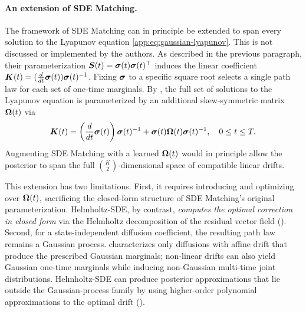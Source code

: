 \paragraph{An extension of SDE Matching.}
The framework of SDE Matching \cite{bartosh2025sde} can in principle be extended to span every solution to the Lyapunov equation \eqref{app:eq:gaussian-lyapunov}.
This is not discussed or implemented by the authors. 
As described in the previous paragraph, their parameterization $\boldsymbol{S}(t) = \boldsymbol{\sigma}(t)\boldsymbol{\sigma}(t)^\top$ induces the linear coefficient $\boldsymbol{K}(t) = (\frac{d}{dt}\boldsymbol{\sigma}(t)) \boldsymbol{\sigma}(t)^{-1}$. 
Fixing $\boldsymbol{\sigma}$ to a specific square root selects a single path law for each set of one-time marginals. 
By , the full set of solutions to the Lyapunov equation is parameterized by an additional skew-symmetric matrix $\boldsymbol{\Omega}(t)$ via
\begin{equation*}
    \boldsymbol{K}(t) = \left(\frac{d}{dt}\boldsymbol{\sigma}(t) \right) \boldsymbol{\sigma}(t)^{-1} + \boldsymbol{\sigma}(t) \boldsymbol{\Omega}(t) \boldsymbol{\sigma}(t)^{-1}, \quad 0 \leq t \leq T.
\end{equation*}
Augmenting SDE Matching with a learned $\boldsymbol{\Omega}(t)$ would in principle allow the posterior to span the full $\binom{K}{2}$-dimensional space of compatible linear drifts.

This extension has two limitations. 
First, it requires introducing and optimizing over $\boldsymbol{\Omega}(t)$, sacrificing the closed-form structure of SDE Matching's original parameterization. 
Helmholtz-SDE, by contrast, \emph{computes the optimal correction in closed form} via the Helmholtz decomposition of the residual vector field (). 
Second, for a state-independent diffusion coefficient, the resulting path law remains a Gaussian process.
 characterizes only diffusions with affine drift that produce the prescribed Gaussian marginals; non-linear drifts can also yield Gaussian one-time marginals while inducing non-Gaussian multi-time joint distributions. 
Helmholtz-SDE can produce posterior approximations that lie outside the Gaussian-process family by using higher-order polynomial approximations to the optimal drift ().